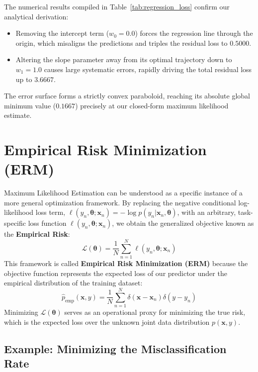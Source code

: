 \documentclass{article}
\begin{document}
The numerical results compiled in Table~\ref{tab:regression_loss} confirm our analytical derivation:
\begin{itemize}
    \item Removing the intercept term ($w_0 = 0.0$) forces the regression line through the origin, which misaligns the predictions and triples the residual loss to $0.5000$.
    \item Altering the slope parameter away from its optimal trajectory down to $w_1 = 1.0$ causes large systematic errors, rapidly driving the total residual loss up to $3.6667$.
\end{itemize}
The error surface forms a strictly convex paraboloid, reaching its absolute global minimum value ($0.1667$) precisely at our closed-form maximum likelihood estimate.

\section{Empirical Risk Minimization (ERM)}

Maximum Likelihood Estimation can be understood as a specific instance of a more general optimization framework. By replacing the negative conditional log-likelihood loss term, $\ell(y_n, \boldsymbol{\theta}; \mathbf{x}_n) = -\log p(y_n | \mathbf{x}_n, \boldsymbol{\theta})$, with an arbitrary, task-specific loss function $\ell(y_n, \boldsymbol{\theta}; \mathbf{x}_n)$, we obtain the generalized objective known as the \textbf{Empirical Risk}:
\begin{equation}
\mathcal{L}(\boldsymbol{\theta}) = \frac{1}{N} \sum_{n=1}^N \ell(y_n, \boldsymbol{\theta}; \mathbf{x}_n)
\end{equation}
This framework is called \textbf{Empirical Risk Minimization (ERM)} because the objective function represents the expected loss of our predictor under the empirical distribution of the training dataset:
\begin{equation}
\hat{p}_{\text{emp}}(\mathbf{x}, y) = \frac{1}{N} \sum_{n=1}^N \delta(\mathbf{x} - \mathbf{x}_n)\delta(y - y_n)
\end{equation}
Minimizing $\mathcal{L}(\boldsymbol{\theta})$ serves as an operational proxy for minimizing the true risk, which is the expected loss over the unknown joint data distribution $p(\mathbf{x}, y)$.

\subsection{Example: Minimizing the Misclassification Rate}
\end{document}

